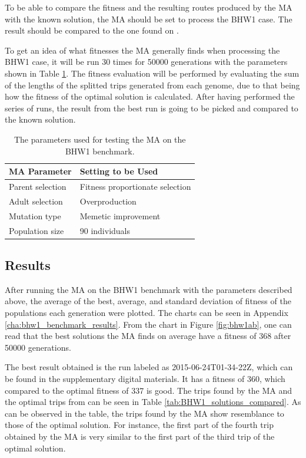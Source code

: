 To be able to compare the fitness and the resulting routes produced by the MA with the known solution, the MA should be set to process the BHW1 case. The result should be compared to the one found on \citet{BHW1Solution}.

To get an idea of what fitnesses the MA generally finds when processing the BHW1 case, it will be run 30 times for 50000 generations with the parameters shown in Table \ref{tab:BHW1_params_table}. The fitness evaluation will be performed by evaluating the sum of the lengths of the splitted trips generated from each genome, due to that being how the fitness of the optimal solution is calculated. After having performed the series of runs, the result from the best run is going to be picked and compared to the known solution.

{
\begin{table}[tbph]
\centering
\begin{tabular}{ll}
\toprule
\textbf{MA Parameter} & \textbf{Setting to be Used}     \\ \midrule
Parent selection      & Fitness proportionate selection \\
Adult selection       & Overproduction                  \\
Mutation type         & Memetic improvement             \\
Population size       & 90 individuals                  \\ \bottomrule
\end{tabular}
\caption{The parameters used for testing the MA on the BHW1 benchmark.}
\label{tab:BHW1_params_table}
\end{table}
}

\subsection{Results}

After running the MA on the BHW1 benchmark with the parameters described above, the average of the best, average, and standard deviation of fitness of the populations each generation were plotted. The charts can be seen in Appendix \ref{cha:bhw1_benchmark_results}. From the chart in Figure \ref{fig:bhw1ab}, one can read that the best solutions the MA finds on average have a fitness of 368 after 50000 generations.

The best result obtained is the run labeled as 2015-06-24T01-34-22Z, which can be found in the supplementary digital materials. It has a fitness of 360, which compared to the optimal fitness of 337 is good. The trips found by the MA and the optimal trips from \citet{BHW1Solution} can be seen in Table \ref{tab:BHW1_solutions_compared}. As can be observed in the table, the trips found by the MA show resemblance to those of the optimal solution. For instance, the first part of the fourth trip obtained by the MA is very similar to the first part of the third trip of the optimal solution.


